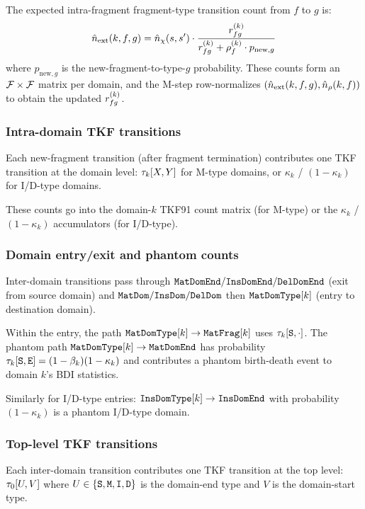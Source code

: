 The expected intra-fragment fragment-type transition count from $f$ to $g$ is:
\begin{equation}
\hat{n}_{\text{ext}}(k,f,g) = \hat{n}_\chi(s, s') \cdot \frac{r^{(k)}_{fg}}{r^{(k)}_{fg} + \rho^{(k)}_f \cdot p_{\text{new},g}}
\end{equation}
where $p_{\text{new},g}$ is the new-fragment-to-type-$g$ probability.
These counts form an $\mathcal{F} \times \mathcal{F}$ matrix per domain,
and the M-step row-normalizes $(\hat{n}_{\text{ext}}(k,f,g), \hat{n}_{\rho}(k,f))$
to obtain the updated $r^{(k)}_{fg}$.

\subsubsection{Intra-domain TKF transitions}

Each new-fragment transition (after fragment termination) contributes
one TKF transition at the domain level: $\tau_k[X, Y]$ for M-type
domains, or $\kappa_k$ / $(1-\kappa_k)$ for I/D-type domains.

These counts go into the domain-$k$ TKF91 count matrix (for M-type)
or the $\kappa_k$ / $(1-\kappa_k)$ accumulators (for I/D-type).

\subsubsection{Domain entry/exit and phantom counts}

Inter-domain transitions pass through $\mathtt{MatDomEnd} / \mathtt{InsDomEnd} / \mathtt{DelDomEnd}$
(exit from source domain) and $\mathtt{MatDom} / \mathtt{InsDom} / \mathtt{DelDom}$ then
$\mathtt{MatDomType}[k]$ (entry to destination domain).

Within the entry, the path $\mathtt{MatDomType}[k] \to \mathtt{MatFrag}[k]$ uses
$\tau_k[{\tt S}, \cdot]$. The phantom path $\mathtt{MatDomType}[k] \to \mathtt{MatDomEnd}$
has probability $\tau_k[{\tt S}, {\tt E}] = (1-\beta_k)(1-\kappa_k)$ and
contributes a phantom birth-death event to domain $k$'s BDI statistics.

Similarly for I/D-type entries: $\mathtt{InsDomType}[k] \to \mathtt{InsDomEnd}$ with
probability $(1-\kappa_k)$ is a phantom I/D-type domain.

\subsubsection{Top-level TKF transitions}

Each inter-domain transition contributes one TKF transition at the top level:
$\tau_0[U, V]$ where $U \in \{{\tt S}, {\tt M}, {\tt I}, {\tt D}\}$ is the
domain-end type and $V$ is the domain-start type.

